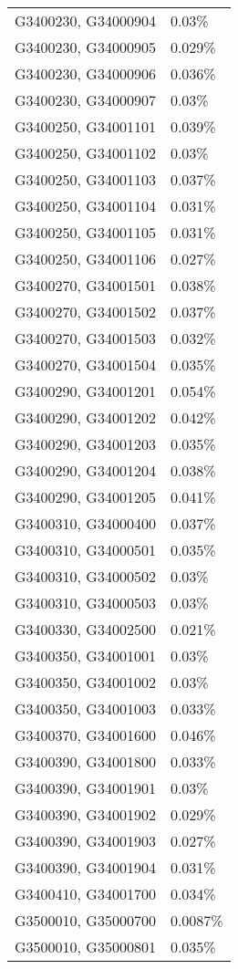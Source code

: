 \begin{longtable}[]{@{}ll@{}}
G3400230, G34000904 & 0.03\% \\
G3400230, G34000905 & 0.029\% \\
G3400230, G34000906 & 0.036\% \\
G3400230, G34000907 & 0.03\% \\
G3400250, G34001101 & 0.039\% \\
G3400250, G34001102 & 0.03\% \\
G3400250, G34001103 & 0.037\% \\
G3400250, G34001104 & 0.031\% \\
G3400250, G34001105 & 0.031\% \\
G3400250, G34001106 & 0.027\% \\
G3400270, G34001501 & 0.038\% \\
G3400270, G34001502 & 0.037\% \\
G3400270, G34001503 & 0.032\% \\
G3400270, G34001504 & 0.035\% \\
G3400290, G34001201 & 0.054\% \\
G3400290, G34001202 & 0.042\% \\
G3400290, G34001203 & 0.035\% \\
G3400290, G34001204 & 0.038\% \\
G3400290, G34001205 & 0.041\% \\
G3400310, G34000400 & 0.037\% \\
G3400310, G34000501 & 0.035\% \\
G3400310, G34000502 & 0.03\% \\
G3400310, G34000503 & 0.03\% \\
G3400330, G34002500 & 0.021\% \\
G3400350, G34001001 & 0.03\% \\
G3400350, G34001002 & 0.03\% \\
G3400350, G34001003 & 0.033\% \\
G3400370, G34001600 & 0.046\% \\
G3400390, G34001800 & 0.033\% \\
G3400390, G34001901 & 0.03\% \\
G3400390, G34001902 & 0.029\% \\
G3400390, G34001903 & 0.027\% \\
G3400390, G34001904 & 0.031\% \\
G3400410, G34001700 & 0.034\% \\
G3500010, G35000700 & 0.0087\% \\
G3500010, G35000801 & 0.035\% \\

\end{longtable}

